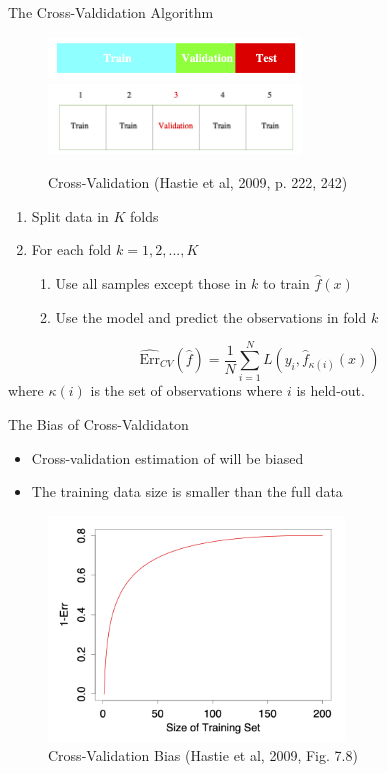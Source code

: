 \documentclass[10pt]{beamer}
\begin{document}
\begin{frame}{The Cross-Valdidation Algorithm}

\begin{figure}[h]
\caption{Cross-Validation (Hastie et al, 2009, p. 222, 242)}
\centering
\includegraphics[width=0.6\textwidth]{figs/ESL_test_train_val.png}
\includegraphics[width=0.6\textwidth]{figs/ESL_cross_val.png}
\end{figure}

\begin{enumerate}
\item Split data in $K$ folds
\item For each fold $k=1,2,...,K$
\begin{enumerate}
\item Use all samples except those in $k$ to train $\hat{f}(x)$
\item Use the model and predict the observations in fold $k$
\end{enumerate}
\end{enumerate}
\[
\widehat{\text{Err}}_{CV}(\hat{f}) = \frac{1}{N}\sum^N_{i=1} L(y_i,\hat{f}_{\kappa(i)}(x))
\]
where $\kappa(i)$ is the set of observations where $i$ is held-out.

\end{frame}

\begin{frame}{The Bias of Cross-Valdidaton}

\begin{itemize}
\item Cross-validation estimation of  will be biased
\item The training data size is smaller than the full data
\end{itemize}

\begin{figure}[h]
\caption{Cross-Validation Bias (Hastie et al, 2009, Fig. 7.8)}
\centering
\includegraphics[width=0.7\textwidth]{figs/ESL_7_8.png}
\end{figure}

\end{frame}
\end{document}
